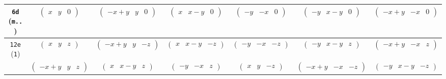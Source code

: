 \documentclass[fleqn,9pt,landscape]{jsarticle}
\begin{document}
\begin{center}
\begin{longtable}{ccccccc}
{\tt 6d} ({\tt m..}) & $ \begin{pmatrix} x & y & 0 \end{pmatrix} $ & $ \begin{pmatrix} - x + y & y & 0 \end{pmatrix} $ & $ \begin{pmatrix} x & x - y & 0 \end{pmatrix} $ & $ \begin{pmatrix} - y & - x & 0 \end{pmatrix} $ & $ \begin{pmatrix} - y & x - y & 0 \end{pmatrix} $ & $ \begin{pmatrix} - x + y & - x & 0 \end{pmatrix} $ \\ \hline
{\tt 12e} ({\tt 1}) & $ \begin{pmatrix} x & y & z \end{pmatrix} $ & $ \begin{pmatrix} - x + y & y & - z \end{pmatrix} $ & $ \begin{pmatrix} x & x - y & - z \end{pmatrix} $ & $ \begin{pmatrix} - y & - x & - z \end{pmatrix} $ & $ \begin{pmatrix} - y & x - y & z \end{pmatrix} $ & $ \begin{pmatrix} - x + y & - x & z \end{pmatrix} $ \\
& $ \begin{pmatrix} - x + y & y & z \end{pmatrix} $ & $ \begin{pmatrix} x & x - y & z \end{pmatrix} $ & $ \begin{pmatrix} - y & - x & z \end{pmatrix} $ & $ \begin{pmatrix} x & y & - z \end{pmatrix} $ & $ \begin{pmatrix} - x + y & - x & - z \end{pmatrix} $ & $ \begin{pmatrix} - y & x - y & - z \end{pmatrix} $ \\
\end{longtable}
\end{center}
\end{document}
